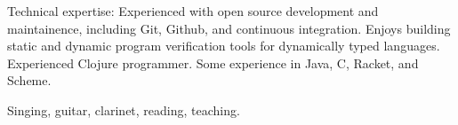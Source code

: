 \documentclass[10pt,a4paper]{article}
\begin{document}

\inlineheadsection  %
  {Technical expertise:}
  {Experienced with open source development and maintainence, 
    including Git, Github, and continuous integration.
    Enjoys building static and dynamic
    program verification tools for dynamically typed languages.
    Experienced Clojure programmer.
    Some experience in Java, C, Racket, and Scheme.
  }


{\bodytext
  {Singing, guitar, clarinet, reading, teaching.}
}
\end{document}
